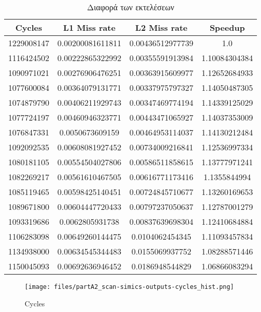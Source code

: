 \documentclass[a4paper,12pt]{article}
\begin{document}
\begin{table}[H]
    \centering
    \begin{tabular}{| c | c | c | c |}
        \hline
        Cycles & L1 Miss rate & L2 Miss rate & Speedup  \\
        \hline
        \hline
        1229008147 & 0.00200081611811 & 0.00436512977739 & 1.0 \\
        1116424502 & 0.00222865322992 & 0.00355591913984 & 1.10084304384 \\
        1090971021 & 0.00276906476251 & 0.00363915609977 & 1.12652684933 \\
        1077600084 & 0.00364079131771 & 0.00337975797327 & 1.14050487305 \\
        1074879790 & 0.00406211929743 & 0.00347469774194 & 1.14339125029 \\
        1077724197 & 0.00460946323771 & 0.00443471065927 & 1.14037353009 \\
        1076847331 & 0.0050673609159 & 0.00464953114037 & 1.14130212484 \\
        1092092535 & 0.00608081927452 & 0.00734009216841 & 1.12536997334 \\
        1080181105 & 0.00554504027806 & 0.00586511858615 & 1.13777971241 \\
        1082269217 & 0.00561610467505 & 0.00616771173416 & 1.1355844994 \\
        1085119465 & 0.00598425140451 & 0.00724845710677 & 1.13260169653 \\
        1089671800 & 0.00604447720433 & 0.00797237050637 & 1.12787001279 \\
        1093319686 & 0.0062805931738 & 0.00837639698304 & 1.12410684884 \\
        1106283098 & 0.00649260144475 & 0.0104062454345 & 1.11093457834 \\
        1134938000 & 0.00634545344483 & 0.0155069937752 & 1.08288571446 \\
        1150045093 & 0.00692636946452 & 0.0186948544829 & 1.06866083294 \\
        \hline
    \end{tabular}
    \caption{Διαφορά των εκτελέσεων}
    \label{fig:T4}
\end{table}

\begin{figure}[H]
	\centering
    \texttt{[image: files/partA2\_scan-simics-outputs-cycles\_hist.png]}
	\caption{Cycles}
	\label{fig:B1}
\end{figure}
\end{document}
